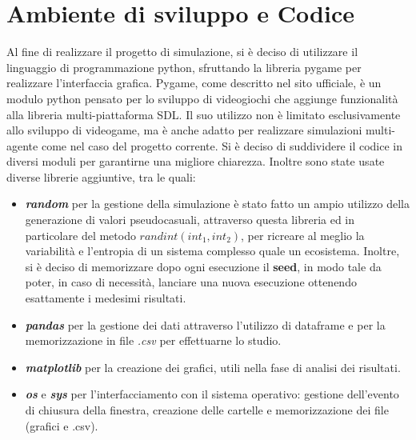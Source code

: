 \documentclass[11pt]{article}
\begin{document}
\section{Ambiente di sviluppo e Codice}
\label{sec:codice}
Al fine di realizzare il progetto di simulazione, si è deciso di utilizzare il linguaggio di programmazione python, sfruttando la libreria pygame per realizzare l'interfaccia grafica. Pygame, come descritto nel sito ufficiale\cite{PyGame}, è un modulo python pensato per lo sviluppo di videogiochi che aggiunge funzionalità alla libreria multi-piattaforma SDL. Il suo utilizzo non è limitato esclusivamente allo sviluppo di videogame, ma è anche adatto per realizzare simulazioni multi-agente come nel caso del progetto corrente. Si è deciso di suddividere il codice in diversi moduli per garantirne una migliore chiarezza. Inoltre sono state usate diverse librerie aggiuntive, tra le quali:
\begin{itemize}
    \item \textit{\textbf{random}} per la gestione della simulazione è stato fatto un ampio utilizzo della generazione di valori pseudocasuali, attraverso questa libreria ed in particolare del metodo $randint(int_1, int_2)$, per ricreare al meglio la variabilità e l'entropia di un sistema complesso quale un ecosistema. Inoltre, si è deciso di  memorizzare dopo ogni esecuzione il \textbf{seed}, in modo tale da poter, in caso di necessità, lanciare una nuova esecuzione ottenendo esattamente i medesimi risultati.
    
    \item \textbf{\textit{pandas}} per la gestione dei dati attraverso l'utilizzo di dataframe e per la memorizzazione in file \textit{.csv} per effettuarne lo studio.
    
    \item \textbf{\textit{matplotlib}} per la creazione dei grafici, utili nella fase di analisi dei risultati.
    
    \item \textbf{\textit{\textit{os}}} e \textbf{\textit{sys}} per l'interfacciamento con il sistema operativo: gestione dell'evento di chiusura della finestra, creazione delle cartelle e memorizzazione dei file (grafici e .csv).
    
\end{itemize} 
\end{document}
